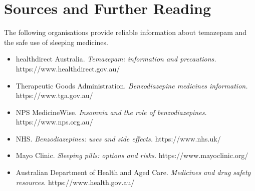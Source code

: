 \section*{Sources and Further Reading}
The following organisations provide reliable information about temazepam and the safe use of sleeping medicines.

\begin{itemize}
    \item healthdirect Australia. \textit{Temazepam: information and precautions.} https://www.healthdirect.gov.au/
    \item Therapeutic Goods Administration. \textit{Benzodiazepine medicines information.} https://www.tga.gov.au/
    \item NPS MedicineWise. \textit{Insomnia and the role of benzodiazepines.} https://www.nps.org.au/
    \item NHS. \textit{Benzodiazepines: uses and side effects.} https://www.nhs.uk/
    \item Mayo Clinic. \textit{Sleeping pills: options and risks.} https://www.mayoclinic.org/
    \item Australian Department of Health and Aged Care. \textit{Medicines and drug safety resources.} https://www.health.gov.au/
\end{itemize}

\clearpage
